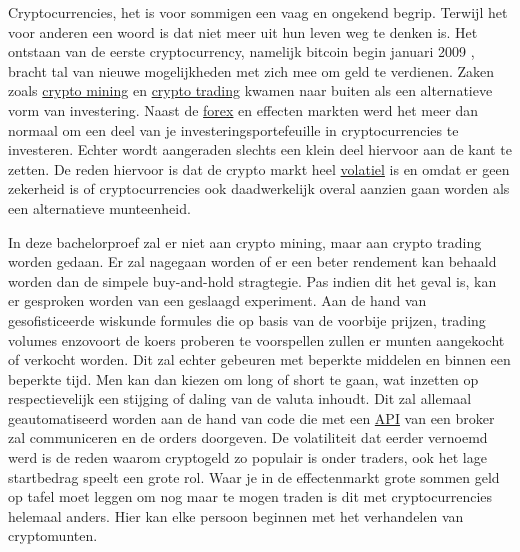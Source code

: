 Cryptocurrencies, het is voor sommigen een vaag en ongekend begrip. Terwijl het voor anderen een woord is dat niet meer uit hun leven weg te denken is. Het ontstaan van de eerste cryptocurrency, namelijk bitcoin begin januari 2009 \autocite{}, bracht tal van nieuwe mogelijkheden met zich mee om geld te verdienen. Zaken zoals
\underline{crypto mining} en \underline{crypto trading} kwamen naar buiten als een alternatieve vorm van investering. Naast de \underline{forex} en effecten markten werd het meer dan normaal om een deel van je investeringsportefeuille in cryptocurrencies te investeren. Echter wordt aangeraden slechts een klein deel hiervoor aan de kant te zetten. De reden hiervoor is dat de crypto markt heel \underline{volatiel} is en omdat er geen zekerheid is of cryptocurrencies ook daadwerkelijk overal aanzien gaan worden als een alternatieve munteenheid.

In deze bachelorproef zal er niet aan crypto mining, maar aan crypto trading worden gedaan. Er zal nagegaan worden of er een beter rendement kan behaald worden dan de simpele buy-and-hold stragtegie. Pas indien dit het geval is, kan er gesproken worden van een geslaagd experiment. Aan de hand van gesofisticeerde wiskunde formules die op basis van de voorbije prijzen, trading volumes enzovoort de koers proberen te voorspellen zullen er munten aangekocht of verkocht worden. Dit zal echter gebeuren met beperkte middelen en binnen een beperkte tijd. Men kan dan kiezen om long of short te gaan, wat inzetten op respectievelijk een stijging of daling van de valuta inhoudt. Dit zal allemaal geautomatiseerd worden aan de hand van code die met een \underline{API} van een broker zal communiceren en de orders doorgeven. De volatiliteit dat eerder vernoemd werd is de reden waarom cryptogeld zo populair is onder traders, ook het lage startbedrag speelt een grote rol. Waar je in de effectenmarkt grote sommen geld op tafel moet leggen om nog maar te mogen traden is dit met cryptocurrencies helemaal anders. Hier kan elke persoon beginnen met het verhandelen van cryptomunten.





